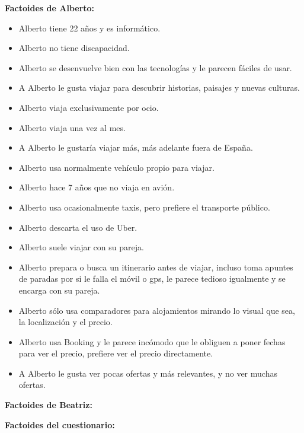 \textbf{Factoides de Alberto:}

\begin{itemize}
    \item Alberto tiene 22 años y es informático.
    \item Alberto no tiene discapacidad.
    \item Alberto se desenvuelve bien con las tecnologías y le parecen fáciles de usar.
    \item A Alberto le gusta viajar para descubrir historias, paisajes y nuevas culturas.
    \item Alberto viaja exclusivamente por ocio.
    \item Alberto viaja una vez al mes.
    \item A Alberto le gustaría viajar más, más adelante fuera de España.
    \item Alberto usa normalmente vehículo propio para viajar.
    \item Alberto hace 7 años que no viaja en avión.
    \item Alberto usa ocasionalmente taxis, pero prefiere el transporte público.
    \item Alberto descarta el uso de Uber.
    \item Alberto suele viajar con su pareja.
    \item Alberto prepara o busca un itinerario antes de viajar, incluso toma apuntes de paradas por si le falla el móvil o gps, le parece tedioso igualmente y se encarga con su pareja.
    \item Alberto sólo usa comparadores para alojamientos mirando lo visual que sea, la localización y el precio.
    \item Alberto usa Booking y le parece incómodo que le obliguen a poner fechas para ver el precio, prefiere ver el precio directamente.
    \item A Alberto le gusta ver pocas ofertas y más relevantes, y no ver muchas ofertas.
\end{itemize}


\textbf{Factoides de Beatriz:}

\textbf{Factoides del cuestionario:}

